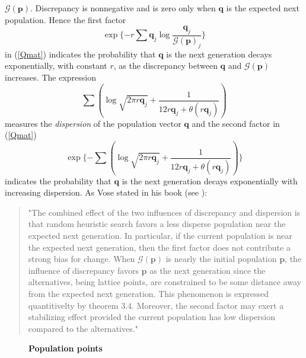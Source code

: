 $\mathcal{G}(\bm{p})$. Discrepancy is nonnegative and is zero only when $\bm{q}$ is the expected next population. Hence the first factor 
\[
\exp\{-r \sum \bm{q}_j \log \frac{\bm{q}_j}{\mathcal{G}(\bm{p})_j}\}
\]
in (\ref{Qmat}) indicates the probability that $\bm{q}$ is the next generation
decays exponentially, with constant $r$, as the discrepancy between $\bm{q}$ and $\mathcal{G}(\bm{p})$ increases.
The expression 
\[
\sum (\log \sqrt{2 \pi r\bm{q}_j} + \frac{1}{12r\bm{q}_j + \theta (r\bm{q}_j)})
\]
measures the {\em dispersion} of the population vector $\bm{q}$ and the second factor in (\ref{Qmat}) 
\[
\exp\{- \sum (\log \sqrt{2 \pi r\bm{q}_j} + \frac{1}{12r\bm{q}_j + \theta (r\bm{q}_j)})\}
\]
indicates the probability that $\bm{q}$ is the next generation decays exponentially with increasing dispersion. 
As Vose stated in his book (see \cite{Vose1999}):
\begin{quote}
"The combined effect of the two influences of discrepancy and dispersion is that random heuristic search favors a less disperse 
population near the expected next generation. In particular, if the current population is near the expected next generation, 
then the first factor does not contribute a strong bias for change. When $\mathcal{G}(\bm{p})$ is nearly the initial population 
$\bm{p}$, the influence of discrepancy favors $\bm{p}$ as the next generation since the alternatives, being lattice points, 
are constrained to be some distance away from the expected next generation. This phenomenon is expressed quantitivelty by theorem $3.4$.
Moreover, the second factor may exert a stabilizing effect provided the current population has low dispersion compared to the alternatives."
\end{quote}

\begin{figure}[H]
\begin{center}
\hspace{4pt}
\caption{\textbf{Population points} }
\label{tetra_popn}
\end{center}
\end{figure}

